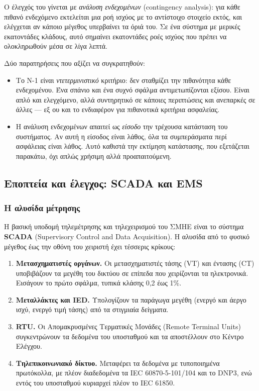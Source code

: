 Ο έλεγχός του γίνεται με \emph{ανάλυση ενδεχομένων} (contingency analysis): για κάθε
πιθανό ενδεχόμενο εκτελείται μια ροή ισχύος με το αντίστοιχο στοιχείο εκτός, και ελέγχεται
αν κάποιο μέγεθος υπερβαίνει τα όριά του. Σε ένα σύστημα με μερικές εκατοντάδες κλάδους,
αυτό σημαίνει εκατοντάδες ροές ισχύος που πρέπει να ολοκληρωθούν μέσα σε λίγα λεπτά.

Δύο παρατηρήσεις που αξίζει να συγκρατηθούν:

\begin{itemize}
\item Το N-1 είναι \emph{ντετερμινιστικό} κριτήριο: δεν σταθμίζει την πιθανότητα κάθε
      ενδεχομένου. Ένα σπάνιο και ένα συχνό σφάλμα αντιμετωπίζονται εξίσου. Είναι απλό και
      ελεγχόμενο, αλλά συντηρητικό σε κάποιες περιπτώσεις και ανεπαρκές σε άλλες — εξ ου
      και το ενδιαφέρον για πιθανοτικά κριτήρια ασφαλείας.
\item Η ανάλυση ενδεχομένων απαιτεί ως \emph{είσοδο} την τρέχουσα κατάσταση του συστήματος.
      Αν αυτή η είσοδος είναι λάθος, όλα τα συμπεράσματα περί ασφάλειας είναι λάθος. Αυτό
      καθιστά την εκτίμηση κατάστασης, που εξετάζεται παρακάτω, όχι απλώς χρήσιμη αλλά
      προαπαιτούμενη.
\end{itemize}

\subsection{Εποπτεία και έλεγχος: SCADA και EMS}

\subsubsection*{Η αλυσίδα μέτρησης}

Η βασική υποδομή τηλεμέτρησης και τηλεχειρισμού του ΣΜΗΕ είναι το σύστημα \textbf{SCADA}
(Supervisory Control and Data Acquisition). Η αλυσίδα από το φυσικό μέγεθος έως την οθόνη
του χειριστή έχει τέσσερις κρίκους:

\begin{enumerate}
\item \textbf{Μετασχηματιστές οργάνων.} Οι μετασχηματιστές τάσης (VT) και έντασης (CT)
      υποβιβάζουν τα μεγέθη του δικτύου σε επίπεδα που χειρίζονται τα ηλεκτρονικά. Εισάγουν
      το πρώτο σφάλμα, τυπικά κλάσης 0,2 έως 1\%.
\item \textbf{Μεταλλάκτες και IED.} Υπολογίζουν τα παράγωγα μεγέθη (ενεργό και άεργο ισχύ,
      ενεργό τιμή τάσης) από τα στιγμιαία δείγματα.
\item \textbf{RTU.} Οι Απομακρυσμένες Τερματικές Μονάδες (Remote Terminal Units)
      συγκεντρώνουν τα δεδομένα του υποσταθμού και τα αποστέλλουν στο Κέντρο Ελέγχου.
\item \textbf{Τηλεπικοινωνιακό δίκτυο.} Μεταφέρει τα δεδομένα με τυποποιημένα πρωτόκολλα,
      με πλέον διαδεδομένα τα IEC 60870-5-101/104 και το DNP3, ενώ εντός του υποσταθμού
      κυριαρχεί πλέον το IEC 61850.
\end{enumerate}

